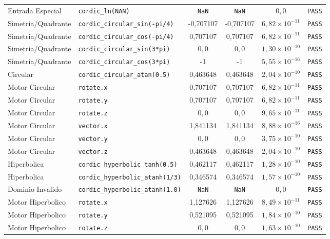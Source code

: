 \begin{table}[htbp]
{\begin{tabular}{llcccc}
Entrada Especial & \texttt{cordic\_ln(NAN)} & \texttt{NaN} & \texttt{NaN} & $0{,}0$ & \texttt{PASS} \\
Simetria/Quadrante & \texttt{cordic\_circular\_sin(-pi/4)} & -0,707107 & -0,707107 & $6,82 \times 10^{-11}$ & \texttt{PASS} \\
Simetria/Quadrante & \texttt{cordic\_circular\_cos(-pi/4)} & 0,707107 & 0,707107 & $6,82 \times 10^{-11}$ & \texttt{PASS} \\
Simetria/Quadrante & \texttt{cordic\_circular\_sin(3*pi)} & $0{,}0$ & $0{,}0$ & $1,30 \times 10^{-10}$ & \texttt{PASS} \\
Simetria/Quadrante & \texttt{cordic\_circular\_cos(3*pi)} & -1 & -1 & $5,55 \times 10^{-16}$ & \texttt{PASS} \\
Circular & \texttt{cordic\_circular\_atan(0.5)} & 0,463648 & 0,463648 & $2,04 \times 10^{-10}$ & \texttt{PASS} \\
Motor Circular & \texttt{rotate.x} & 0,707107 & 0,707107 & $6,82 \times 10^{-11}$ & \texttt{PASS} \\
Motor Circular & \texttt{rotate.y} & 0,707107 & 0,707107 & $6,82 \times 10^{-11}$ & \texttt{PASS} \\
Motor Circular & \texttt{rotate.z} & $0{,}0$ & $0{,}0$ & $9,65 \times 10^{-11}$ & \texttt{PASS} \\
Motor Circular & \texttt{vector.x} & 1,841134 & 1,841134 & $8,88 \times 10^{-16}$ & \texttt{PASS} \\
Motor Circular & \texttt{vector.y} & $0{,}0$ & $0{,}0$ & $3,75 \times 10^{-10}$ & \texttt{PASS} \\
Motor Circular & \texttt{vector.z} & 0,463648 & 0,463648 & $2,04 \times 10^{-10}$ & \texttt{PASS} \\
Hiperbolica & \texttt{cordic\_hyperbolic\_tanh(0.5)} & 0,462117 & 0,462117 & $1,28 \times 10^{-10}$ & \texttt{PASS} \\
Hiperbolica & \texttt{cordic\_hyperbolic\_atanh(1/3)} & 0,346574 & 0,346574 & $1,57 \times 10^{-10}$ & \texttt{PASS} \\
Dominio Invalido & \texttt{cordic\_hyperbolic\_atanh(1.0)} & \texttt{NaN} & \texttt{NaN} & $0{,}0$ & \texttt{PASS} \\
Motor Hiperbolico & \texttt{rotate.x} & 1,127626 & 1,127626 & $8,49 \times 10^{-11}$ & \texttt{PASS} \\
Motor Hiperbolico & \texttt{rotate.y} & 0,521095 & 0,521095 & $1,84 \times 10^{-10}$ & \texttt{PASS} \\
Motor Hiperbolico & \texttt{rotate.z} & $0{,}0$ & $0{,}0$ & $1,63 \times 10^{-10}$ & \texttt{PASS} \\

\end{tabular}}
\end{table}
